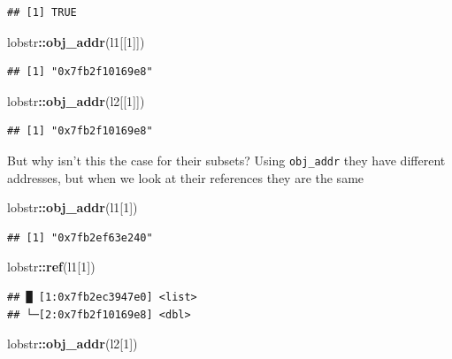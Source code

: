 \documentclass[]{book}
\newenvironment{Shaded}{\begin{snugshade}}{\end{snugshade}}
\newcommand{\DecValTok}[1]{\textcolor[rgb]{0.00,0.00,0.81}{#1}}
\newcommand{\KeywordTok}[1]{\textcolor[rgb]{0.13,0.29,0.53}{\textbf{#1}}}
\newcommand{\NormalTok}[1]{#1}
\newcommand{\OperatorTok}[1]{\textcolor[rgb]{0.81,0.36,0.00}{\textbf{#1}}}
\begin{document}
\begin{verbatim}
## [1] TRUE
\end{verbatim}

\begin{Shaded}
\begin{Highlighting}[]
\NormalTok{lobstr}\OperatorTok{::}\KeywordTok{obj_addr}\NormalTok{(l1[[}\DecValTok{1}\NormalTok{]])}
\end{Highlighting}
\end{Shaded}

\begin{verbatim}
## [1] "0x7fb2f10169e8"
\end{verbatim}

\begin{Shaded}
\begin{Highlighting}[]
\NormalTok{lobstr}\OperatorTok{::}\KeywordTok{obj_addr}\NormalTok{(l2[[}\DecValTok{1}\NormalTok{]])}
\end{Highlighting}
\end{Shaded}

\begin{verbatim}
## [1] "0x7fb2f10169e8"
\end{verbatim}

But why isn't this the case for their subsets? Using \texttt{obj\_addr} they have different addresses, but when we look at their references they are the same

\begin{Shaded}
\begin{Highlighting}[]
\NormalTok{lobstr}\OperatorTok{::}\KeywordTok{obj_addr}\NormalTok{(l1[}\DecValTok{1}\NormalTok{])}
\end{Highlighting}
\end{Shaded}

\begin{verbatim}
## [1] "0x7fb2ef63e240"
\end{verbatim}

\begin{Shaded}
\begin{Highlighting}[]
\NormalTok{lobstr}\OperatorTok{::}\KeywordTok{ref}\NormalTok{(l1[}\DecValTok{1}\NormalTok{])}
\end{Highlighting}
\end{Shaded}

\begin{verbatim}
## █ [1:0x7fb2ec3947e0] <list> 
## └─[2:0x7fb2f10169e8] <dbl>
\end{verbatim}

\begin{Shaded}
\begin{Highlighting}[]
\NormalTok{lobstr}\OperatorTok{::}\KeywordTok{obj_addr}\NormalTok{(l2[}\DecValTok{1}\NormalTok{])}
\end{Highlighting}
\end{Shaded}
\end{document}
